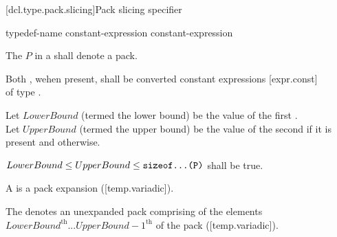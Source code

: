 \documentclass{wg21}
\begin{document}


\begin{addedblock}

[dcl.type.pack.slicing]{Pack slicing specifier}

\begin{bnf}
    \br
    typedef-name  \terminal{[} constant-expression \terminal{:} constant-expression\opt \terminal{]}  \br
\end{bnf}

The  $P$ in a  shall denote a pack.

Both , wehen present, shall be converted constant expressions [expr.const]\\
of type .

Let $LowerBound$ (termed the lower bound) be the value of the first .\\
Let $UpperBound$ (termed the upper bound) be the value of the second  if it is present and  otherwise.

$LowerBound \leq UpperBound \leq \texttt{sizeof...(P)}$ shall be true.

A  is a pack expansion ([temp.variadic]).

\begin{note}
The  denotes an unexpanded pack comprising of the elements $LowerBound^\text{th} ... UpperBound-1^\text{th}$ of the pack ([temp.variadic]).
\end{note}

\end{addedblock}


%
%
%
%
%
%
\end{document}
